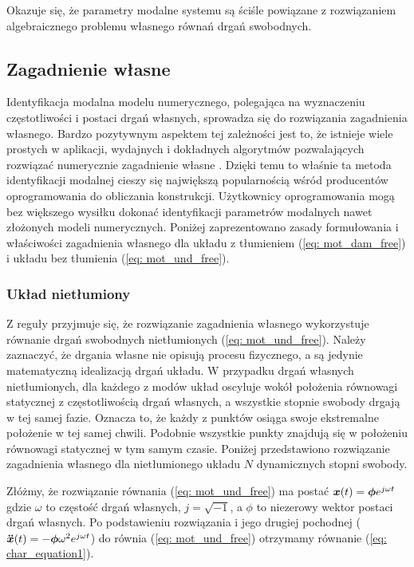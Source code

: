 Okazuje się, że parametry modalne systemu są ściśle powiązane z rozwiązaniem algebraicznego problemu własnego równań drgań swobodnych. 

\subsection{Zagadnienie własne} \label{sect:modal_analysis}
Identyfikacja modalna modelu numerycznego, polegająca na wyznaczeniu częstotliwości i postaci drgań własnych, sprowadza się do rozwiązania zagadnienia własnego. Bardzo pozytywnym aspektem tej zależności jest to, że istnieje wiele prostych w aplikacji, wydajnych i dokładnych algorytmów pozwalających rozwiązać numerycznie zagadnienie własne \parencite{Golub2013}. Dzięki temu to właśnie ta metoda identyfikacji modalnej cieszy się największą popularnością wśród producentów oprogramowania do obliczania konstrukcji. Użytkownicy oprogramowania mogą bez większego wysiłku dokonać identyfikacji parametrów modalnych nawet złożonych modeli numerycznych. Poniżej zaprezentowano zasady formułowania i właściwości zagadnienia własnego dla układu z tłumieniem (\ref{eq: mot_dam_free}) i układu bez tłumienia (\ref{eq: mot_und_free}).
\subsubsection{Układ nietłumiony}
Z reguły przyjmuje się, że rozwiązanie zagadnienia własnego wykorzystuje równanie drgań swobodnych nietłumionych (\ref{eq: mot_und_free}). Należy zaznaczyć, że drgania własne nie opisują procesu fizycznego, a są jedynie matematyczną idealizacją drgań układu. W przypadku drgań własnych nietłumionych, dla każdego z modów układ oscyluje wokół położenia równowagi statycznej z częstotliwością drgań własnych, a wszystkie stopnie swobody drgają w tej samej fazie. Oznacza to, że każdy z punktów osiąga swoje ekstremalne położenie w tej samej chwili. Podobnie wszystkie punkty znajdują się w położeniu równowagi statycznej w tym samym czasie. Poniżej przedstawiono rozwiązanie zagadnienia własnego dla nietłumionego układu $N$ dynamicznych stopni swobody.

Złóżmy, że rozwiązanie równania (\ref{eq: mot_und_free}) ma postać $\bm{x}(t)=\bm{\phi}e^{j\omega t}$ gdzie $\omega$ to częstość drgań własnych, $j=\sqrt{-1}$, a $\phi$ to niezerowy wektor postaci drgań własnych. Po podstawieniu rozwiązania i jego drugiej pochodnej ($\bm{\ddot{x}}(t)=-\bm{\phi} \omega^2 e^{j\omega t}$) do równia (\ref{eq: mot_und_free}) otrzymamy równanie (\ref{eq: char_equation1}).


